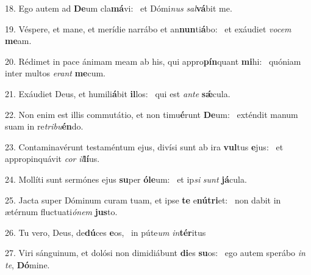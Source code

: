 18. Ego autem ad \textbf{De}um cla\textbf{má}vi: \ast\  et Dómi\textit{nus} \textit{sal}\textbf{vá}bit me.\

19. Véspere, et mane, et merídie narrábo et an\textbf{nun}ti\textbf{á}bo: \ast\  et exáudiet \textit{vo}\textit{cem} \textbf{me}am.\

20. Rédimet in pace ánimam meam ab his, qui appro\textbf{pín}quant \textbf{mi}hi: \ast\  quóniam inter multos \textit{e}\textit{rant} \textbf{me}cum.\

21. Exáudiet Deus, et humili\textbf{á}bit \textbf{il}los: \ast\  qui est \textit{an}\textit{te} \textbf{sǽ}cula.\

22. Non enim est illis commutátio, et non timu\textbf{é}runt \textbf{De}um: \ast\  exténdit manum suam in re\textit{tri}\textit{bu}\textbf{én}do.\

23. Contaminavérunt testaméntum ejus, divísi sunt ab ira \textbf{vul}tus \textbf{e}jus: \ast\  et appropinquávit \textit{cor} \textit{il}\textbf{lí}us.\

24. Mollíti sunt sermónes ejus \textbf{su}per \textbf{ó}\textbf{le}um: \ast\  et ip\textit{si} \textit{sunt} \textbf{já}cula.\

25. Jacta super Dóminum curam tuam, et ipse \textbf{te} e\textbf{nú}\textbf{tri}et: \ast\  non dabit in ætérnum fluctuati\textit{ó}\textit{nem} \textbf{jus}to.\

26. Tu vero, Deus, de\textbf{dú}ces \textbf{e}os, \ast\  in púte\textit{um} \textit{in}\textbf{tér}itus\

27. Viri sánguinum, et dolósi non dimidiábunt \textbf{di}es \textbf{su}os: \ast\  ego autem sperábo \textit{in} \textit{te}, \textbf{Dó}mine.\

